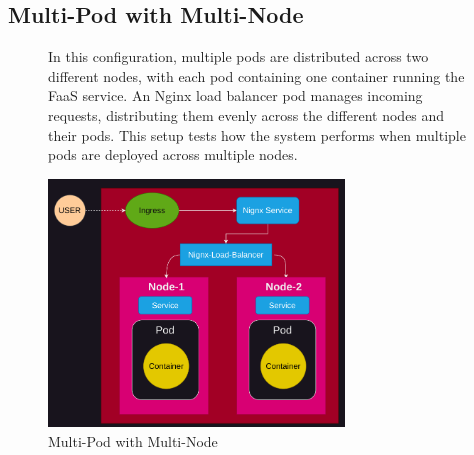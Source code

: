 \documentclass{article}
\begin{document}
\subsection{Multi-Pod with Multi-Node}
\nobreak
\vspace{-30px}
\begin{figure}[h]
    \begin{minipage}[t]{0.6\textwidth}
        \vspace{-100px}
        In this configuration, multiple pods are distributed across two different
        nodes, with each pod containing one container running the FaaS service. An
        Nginx load balancer pod manages incoming requests, distributing them evenly
        across the different nodes and their pods. This setup tests how the system
        performs when multiple pods are deployed across multiple nodes.
    \end{minipage}%
    \hfill
    \begin{minipage}[b]{0.4\textwidth}
        \centering
        \includegraphics[width=0.7\textwidth]{../images/two_node.png}
        \caption{Multi-Pod with Multi-Node}
        \label{fig:multi_pod_multi_node}
    \end{minipage}
\end{figure}


\vspace{-10px}
\end{document}
